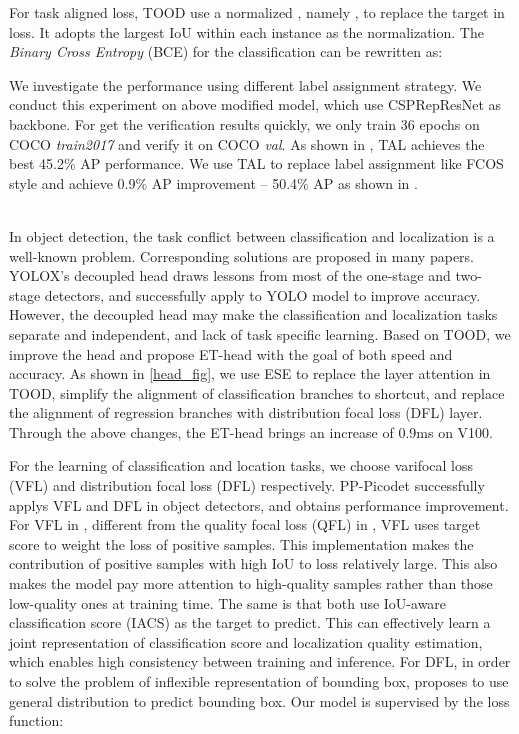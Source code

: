 \documentclass[final]{cvpr}
\begin{document}
For task aligned loss, TOOD use a normalized , namely , to replace the target in loss. It adopts the largest IoU within each instance as the normalization. The \textit{Binary Cross Entropy} (BCE) for the classification can be rewritten as:

We investigate the performance using different label assignment strategy. We conduct this experiment on above modified model, which use CSPRepResNet as backbone. For get the verification results quickly, we only train 36 epochs on COCO \textit{train2017} and verify it on COCO \textit{val}. As shown in , TAL achieves the best 45.2\% AP performance. We use TAL to replace label assignment like FCOS style and achieve 0.9\% AP improvement -- 50.4\% AP as shown in .

~\\

 In object detection, the task conflict between classification and localization is a well-known problem. Corresponding solutions are proposed in many papers\cite{tood,zhang2021varifocalnet,li2020generalized,2021Rethinking}. YOLOX's decoupled head draws lessons from most of the one-stage and two-stage detectors, and successfully apply to YOLO model to improve accuracy. However, the decoupled head may make the classification and localization tasks separate and independent, and lack of task specific learning. Based on TOOD\cite{tood}, we improve the head and propose ET-head with the goal of both speed and accuracy. As shown in \cref{head_fig}, we use ESE to replace the layer attention in TOOD, simplify the alignment of classification branches to shortcut, and replace the alignment of regression branches with distribution focal loss (DFL) layer\cite{li2020generalized}. Through the above changes, the ET-head brings an increase of 0.9ms on V100.

For the learning of classification and location tasks, we choose varifocal loss (VFL) and distribution focal loss (DFL) respectively. PP-Picodet\cite{picodet} successfully applys VFL and DFL in object detectors, and obtains performance improvement. For VFL in \cite{zhang2021varifocalnet}, different from the quality focal loss (QFL) in \cite{li2020generalized}, VFL uses target score to weight the loss of positive samples. This implementation makes the contribution of positive samples with high IoU to loss relatively large. This also makes the model pay more attention to high-quality samples rather than those low-quality ones at training time. The same is that both use IoU-aware classification score (IACS) as the target to predict. This can effectively learn a joint representation of classification score and localization quality estimation, which enables high consistency between training and inference. For DFL, in order to solve the problem of inflexible representation of bounding box, \cite{li2020generalized} proposes to use general distribution to predict bounding box. Our model is supervised by the loss function:
\end{document}
